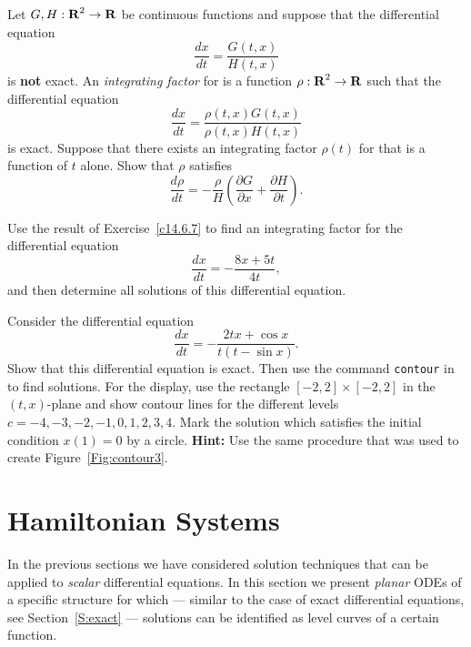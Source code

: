 \documentclass{ximera}
\begin{document}
\begin{exercise} \label{c14.6.7}
Let $G,H:\mbox{$\bf{R}$}^2\to\mbox{$\bf{R}$}$ be continuous functions and suppose that the differential 
equation 
\begin{equation}  \label{eq:if1}
\frac{dx}{dt} = \frac{G(t,x)}{H(t,x)}
\end{equation}
is {\bf not} exact.   An {\em integrating factor\/} for  is 
a function $\rho:\mbox{$\bf{R}$}^2\rightarrow\mbox{$\bf{R}$}$ such that the differential equation
\[
\frac{dx}{dt} = \frac{\rho(t,x) G(t,x)}{\rho(t,x)H(t,x)}
\]
is exact.  Suppose that there exists an integrating factor $\rho(t)$ for 
 that is a function of $t$ alone.  Show that $\rho$ satisfies
\[
\frac{d\rho}{dt} = -\frac{\rho}{H}
\left( \frac{\partial G}{\partial x}+\frac{\partial H}{\partial t}\right).
\]
\end{exercise}

\begin{exercise} \label{c14.6.7A}
Use the result of Exercise~\ref{c14.6.7} to find an integrating factor for 
the differential equation
\[
\frac{dx}{dt} = -\frac{8x+5t}{4t},
\]
and then determine all solutions of this differential equation.
\end{exercise}

\CEXER


\begin{exercise} \label{c14.6.8}
Consider the differential equation
\[
\frac{dx}{dt} = -\frac{2tx+\cos x}{t(t-\sin x)}.
\]
Show that this differential equation is 
exact.  Then use the command {\tt contour} in \Matlab 
to find solutions.  For the display, 
use the rectangle $[-2,2]\times [-2,2]$ in the $(t,x)$-plane and show contour
lines for the different levels $c=-4,-3,-2,-1,0,1,2,3,4$.  Mark the solution
which satisfies the initial condition $x(1)=0$ by a circle.
{\bf Hint:} Use the same procedure that was used to create 
Figure~\ref{Fig:contour3}.
\end{exercise}


\section{Hamiltonian Systems}
\label{sec:HamSys}

In the previous sections we have considered solution techniques that
can be applied to {\em scalar\/} differential equations.  In this section 
we present {\em planar\/} ODEs of a specific structure for which 
--- similar to the case of exact differential equations, see 
Section~\ref{S:exact} --- solutions
can be identified as level curves of a certain function.
\end{document}
